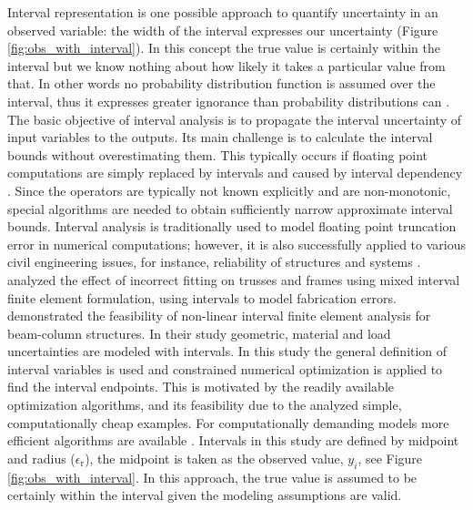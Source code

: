 Interval representation is one possible approach to quantify uncertainty in an observed variable: the width of the interval expresses our uncertainty (Figure \ref{fig:obs_with_interval}). In this concept the true value is certainly within the interval but we know nothing about how likely it takes a particular value from that. In other words no probability distribution function is assumed over the interval, thus it expresses greater ignorance than probability distributions can \citep{Huber2010}.
The basic objective of interval analysis is to propagate the interval uncertainty of input variables to the outputs. Its main challenge is to calculate the interval bounds without overestimating them. This typically occurs if floating point computations are simply replaced by intervals and caused by interval dependency \citep{Moore2009}. Since the operators are typically not known explicitly and are non-monotonic, special algorithms are needed to obtain sufficiently narrow approximate interval bounds.
Interval analysis is traditionally used to model floating point truncation error in numerical computations; however, it is also successfully applied to various civil engineering issues, for instance, reliability of structures \citep{Qiu2008} and systems \citep{Qiu2007}. \citet{Rao2015} analyzed the effect of incorrect fitting on trusses and frames using mixed interval finite element formulation, using intervals to model fabrication errors. \citet{Muhanna2015} demonstrated the feasibility of non-linear interval finite element analysis for beam-column structures. In their study geometric, material and load uncertainties are modeled with intervals.
In this study the general definition of interval variables is used and constrained numerical optimization is applied to find the interval endpoints. This is motivated by the readily available optimization algorithms, and its feasibility due to the analyzed simple, computationally cheap examples. For computationally demanding models more efficient algorithms are available \citep{Zhang2010, Alibrandi2015, Muhanna2015}.
Intervals in this study are defined by midpoint and radius ($\epsilon_\mathrm{r}$), the midpoint is taken as the observed value, $y_i$, see Figure \ref{fig:obs_with_interval}. In this approach, the true value is assumed to be certainly within the interval given the modeling assumptions are valid.
